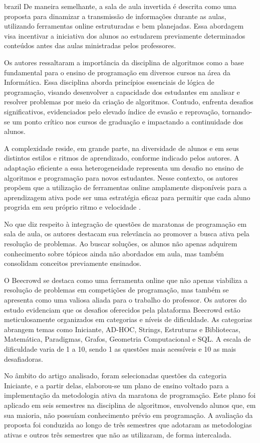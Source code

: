 \begin{otherlanguage*}{brazil}
De maneira semelhante, a sala de aula invertida é descrita como uma proposta para dinamizar a transmissão de informações durante as aulas, utilizando ferramentas online estruturadas e bem planejadas. Essa abordagem visa incentivar a iniciativa dos alunos ao estudarem previamente determinados conteúdos antes das aulas ministradas pelos professores.

Os autores ressaltaram a importância da disciplina de algoritmos como a base fundamental para o ensino de programação em diversos cursos na área da Informática. Essa disciplina aborda princípios essenciais de lógica de programação, visando desenvolver a capacidade dos estudantes em analisar e resolver problemas por meio da criação de algoritmos. Contudo, enfrenta desafios significativos, evidenciados pelo elevado índice de evasão e reprovação, tornando-se um ponto crítico nos cursos de graduação e impactando a continuidade dos alunos. 

A complexidade reside, em grande parte, na diversidade de alunos e em seus distintos estilos e ritmos de aprendizado, conforme indicado pelos autores. A adaptação eficiente a essa heterogeneidade representa um desafio no ensino de algoritmos e programação para novos estudantes. Nesse contexto, os autores propõem que a utilização de ferramentas online amplamente disponíveis para a aprendizagem ativa pode ser uma estratégia eficaz para permitir que cada aluno progrida em seu próprio ritmo e velocidade \cite[p.~5]{cruz2022}. 

No que diz respeito à integração de questões de maratonas de programação em sala de aula, os autores destacam sua relevância ao promover a busca ativa pela resolução de problemas. Ao buscar soluções, os alunos não apenas adquirem conhecimento sobre tópicos ainda não abordados em aula, mas também consolidam conceitos previamente ensinados.

O Beecrowd se destaca como uma ferramenta online que não apenas viabiliza a resolução de problemas em competições de programação, mas também se apresenta como uma valiosa aliada para o trabalho do professor. Os autores do estudo evidenciam que os desafios oferecidos pela plataforma Beecrowd estão meticulosamente organizados em categorias e níveis de dificuldade. As categorias abrangem temas como Iniciante, AD-HOC, Strings, Estruturas e Bibliotecas, Matemática, Paradigmas, Grafos, Geometria Computacional e SQL. A escala de dificuldade varia de 1 a 10, sendo 1 as questões mais acessíveis e 10 as mais desafiadoras.

No âmbito do artigo analisado, foram selecionadas questões da categoria Iniciante, e a partir delas, elaborou-se um plano de ensino voltado para a implementação da metodologia ativa da maratona de programação. Este plano foi aplicado em seis semestres na disciplina de algoritmos, envolvendo alunos que, em sua maioria, não possuíam conhecimento prévio em programação. A avaliação da proposta foi conduzida ao longo de três semestres que adotaram as metodologias ativas e outros três semestres que não as utilizaram, de forma intercalada. 


\end{otherlanguage*}
